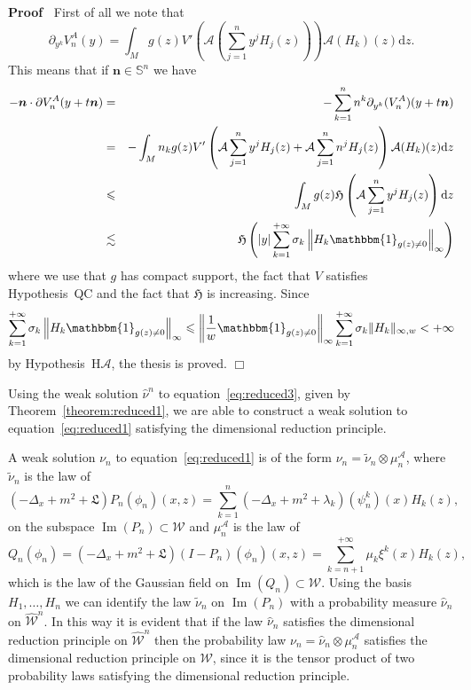 \documentclass[a4paper,10pt]{article}
\newcommand{\mathd}{\mathrm{d}}
\newcommand{\tmmathbf}[1]{\ensuremath{\boldsymbol{#1}}}
\newcommand{\tmop}[1]{\ensuremath{\operatorname{#1}}}
\newenvironment{proof}{\noindent\textbf{Proof\ }}{\hspace*{\fill}$\Box$\medskip}
\begin{document}
\begin{proof}
  First of all we note that
  \[ \partial_{y^k} V^A_n (y) = \int_M g (z) V' \left( \mathcal{} \mathcal{A}
     \left( \sum_{j = 1}^n y^j H_j (z) \right) \right) \mathcal{A} (H_k) (z)
     \mathd z. \]
  This means that if $\tmmathbf{n} \in \mathbb{S}^n$ we have
  \begin{eqnarray}
    -\tmmathbf{n} \cdot \partial V_n^A (y + t\tmmathbf{n}) & = & - \sum_{k =
    1}^n n^k \partial_{y^k} (V_n^A) (y + t\tmmathbf{n}) \nonumber\\
    & = & - \int_M n_k g (z) V' \left( \mathcal{A} \sum_{j = 1}^n y^j H_j (z)
    + \mathcal{A} \sum_{j = 1}^n n^j H_j (z) \right) \mathcal{A} (H_k) (z)
    \mathd z \nonumber\\
    & \leqslant & \int_M g (z) \mathfrak{H} \left( \mathcal{A} \sum_{j = 1}^n
    y^j H_j (z) \right) \mathd z \nonumber\\
    & \lesssim & \mathfrak{H} \left( | y | \sum_{k = 1}^{+ \infty} \sigma_k
    \left\| H_k \mathbbm{1}_{g (z) \not{=} 0} \right\|_{\infty} \right)
    \nonumber
  \end{eqnarray}
  where we use that $g$ has compact support, the fact that $V$ satisfies
  Hypothesis~QC and the fact that $\mathfrak{H}$ is increasing. Since
  \[ \sum_{k = 1}^{+ \infty} \sigma_k \left\| H_k \mathbbm{1}_{g (z) \not{=}
     0} \right\|_{\infty} \leqslant \left\| \frac{1}{w} \mathbbm{1}_{g (z)
     \not{=} 0} \right\|_{\infty} \sum_{k = 1}^{+ \infty} \sigma_k \| H_k
     \|_{\infty, w} < + \infty \]
  by Hypothesis~H$\mathcal{A}$, the thesis is proved.
\end{proof}

Using the weak solution $\hat{\nu}^n$ to equation~{\eqref{eq:reduced3}}, given
by Theorem~\ref{theorem:reduced1}, we are able to construct a weak solution to
equation~{\eqref{eq:reduced1}} satisfying the dimensional reduction principle.

A weak solution $\nu_n$ to equation~{\eqref{eq:reduced1}} is of the form
$\nu_n = \tilde{\nu}_n \otimes \mu_n^{\mathcal{A}}$, where $\tilde{\nu}_n$ is
the law of
\[ (- \Delta_x + m^2 + \mathfrak{L}) P_n (\phi_n) (x, z) = \sum_{k = 1}^n (-
   \Delta_x + m^2 + \lambda_k) (\psi^k_n) (x) H_k (z), \]
on the subspace $\tmop{Im} (P_n) \subset \mathcal{W}$ and
$\mu_n^{\mathcal{A}}$ is the law of
\[ Q_n (\phi_n) = (- \Delta_x + m^2 + \mathfrak{L}) (I - P_n) (\phi_n) (x, z)
   = \sum_{k = n + 1}^{+ \infty} \mathcal{} \mu_k \xi^k (x) H_k (z), \]
which is the law of the Gaussian field on $\tmop{Im} (Q_n) \subset
\mathcal{W}$. Using the basis $H_1, \ldots, H_n$ we can identify the law
$\tilde{\nu}_n$ on $\tmop{Im} (P_n)$ with a probability measure $\hat{\nu}_n$
on $\widehat{\mathcal{W}}^n$. In this way it is evident that if the law
$\hat{\nu}_n$ satisfies the dimensional reduction principle on
$\widehat{\mathcal{W}}^n$ then the probability law $\nu_n = \hat{\nu}_n
\otimes \mu_n^{\mathcal{A}}$ satisfies the dimensional reduction principle on
$\mathcal{W}$, since it is the tensor product of two probability laws
satisfying the dimensional reduction principle.
\end{document}
